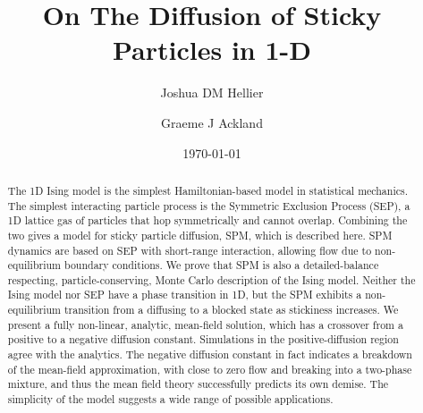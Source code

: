 \documentclass[
reprint,
 amsmath,amssymb,
 aps,
 prl,
]{revtex4-1}
\begin{document}
\title{On The Diffusion of Sticky Particles in 1-D}

\author{Joshua DM Hellier}
\author{Graeme J Ackland}

\date{\today}%

\begin{abstract}
The 1D Ising model is the simplest Hamiltonian-based model in statistical
mechanics. The simplest interacting particle process is the Symmetric
Exclusion Process (SEP), a  1D lattice gas of particles that hop
symmetrically and cannot overlap.  Combining the two gives a model for
sticky particle diffusion, SPM, which is described here.  SPM dynamics
are based on SEP with short-range interaction, allowing flow due to
non-equilibrium boundary conditions.  We prove that SPM is also a
detailed-balance respecting, particle-conserving,  Monte Carlo description of the Ising
model.  Neither the Ising model nor SEP have a phase transition in 1D, but the SPM exhibits a non-equilibrium transition from a
diffusing to a blocked state as stickiness increases.  We present a
fully non-linear, analytic, mean-field solution, which has a crossover
from a positive to a negative diffusion constant.  Simulations in the
positive-diffusion region agree with the analytics. The negative
diffusion constant in fact indicates a breakdown of the mean-field
approximation, with close to zero flow and breaking into a two-phase
mixture, and thus the mean field theory successfully predicts its own
demise.  The simplicity of the model suggests a wide range of
possible applications.


\end{abstract}

\maketitle
\end{document}
